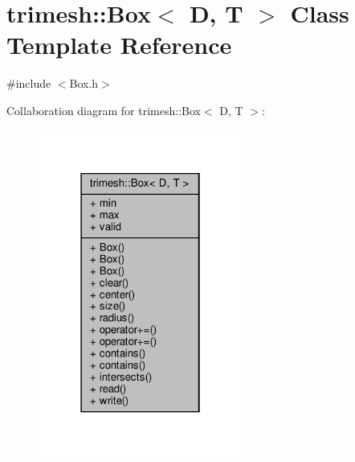\hypertarget{classtrimesh_1_1Box}{}\section{trimesh\+:\+:Box$<$ D, T $>$ Class Template Reference}
\label{classtrimesh_1_1Box}


{\ttfamily \#include $<$Box.\+h$>$}



Collaboration diagram for trimesh\+:\+:Box$<$ D, T $>$\+:\nopagebreak
\begin{figure}[H]
\begin{center}
\leavevmode
\includegraphics[width=190pt]{db/d3a/classtrimesh_1_1Box__coll__graph}
\end{center}
\end{figure}
